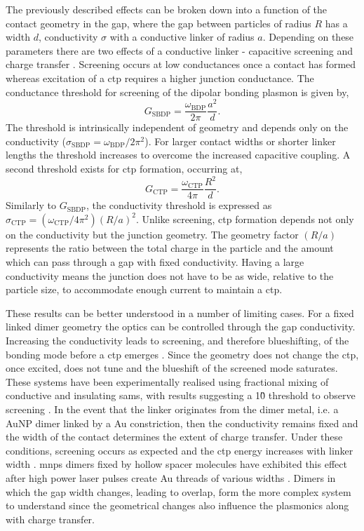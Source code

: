 \documentclass{article}
\begin{document}
The previously described effects can be broken down into a function of the contact geometry in the gap, where the gap between particles of radius $R$ has a width $d$, conductivity $\sigma$ with a conductive linker of radius $a$. Depending on these parameters there are two effects of a conductive linker - capacitive screening and charge transfer \cite{perez2010}. Screening occurs at low conductances once a contact has formed whereas excitation of a \gls{ctp} requires a higher junction conductance. The conductance threshold for screening of the dipolar bonding plasmon is given by,
\begin{equation}
	G_{\mathrm{SBDP}} = \frac{\omega_{\mathrm{BDP}}}{2\pi}\frac{a^2}{d}.
\end{equation}
The threshold is intrinsically independent of geometry and depends only on the conductivity ($\sigma_{\mathrm{SBDP}} = \omega_{\mathrm{BDP}}/2\pi^2$). For larger contact widths or shorter linker lengths the threshold increases to overcome the increased capacitive coupling.
A second threshold exists for \gls{ctp} formation, occurring at,
\begin{equation}
	G_{\mathrm{CTP}} = \frac{\omega_{\mathrm{CTP}}}{4\pi}\frac{R^2}{d}.
\end{equation}
Similarly to $G_{\mathrm{SBDP}}$, the conductivity threshold is expressed as $\sigma_{\mathrm{CTP}} = (\omega_{\mathrm{CTP}}/4\pi^2) (R/a)^2$. Unlike screening, \gls{ctp} formation depends not only on the conductivity but the junction geometry. The geometry factor $(R/a)$ represents the ratio between the total charge in the particle and the amount which can pass through a gap with fixed conductivity. Having a large conductivity means the junction does not have to be as wide, relative to the particle size, to accommodate enough current to maintain a \gls{ctp}.

These results can be better understood in a number of limiting cases. For a fixed linked dimer geometry the optics can be controlled through the gap conductivity. Increasing the conductivity leads to screening, and therefore blueshifting, of the bonding mode before a \gls{ctp} emerges \cite{perez2011, zabala2011}. Since the geometry does not change the \gls{ctp}, once excited, does not tune and the blueshift of the screened mode saturates. These systems have been experimentally realised using fractional mixing of conductive and insulating \glspl{sam}, with results suggesting a 1\G0 threshold to observe screening \cite{benz2014}. In the event that the linker originates from the dimer metal, i.e. a AuNP dimer linked by a Au constriction, then the conductivity remains fixed and the width of the contact determines the extent of charge transfer. Under these conditions, screening occurs as expected and the \gls{ctp} energy increases with linker width \cite{perez2011}. \Glspl{mnp} dimers fixed by hollow spacer molecules have exhibited this effect after high power laser pulses create Au threads of various widths \cite{herrmann2014, tserkezis2014}. Dimers in which the gap width changes, leading to overlap, form the more complex system to understand since the geometrical changes also influence the plasmonics along with charge transfer.
\end{document}
